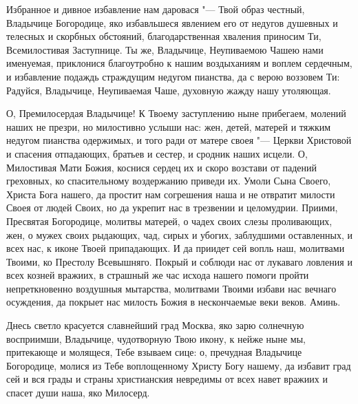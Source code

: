 

Избранное и дивное избавление нам даровася "--- Твой образ честный, Владычице Богородице, яко избавльшеся явлением его от недугов душевных и телесных и скорбных обстояний, благодарственная хваления приносим Ти, Всемилостивая Заступнице. Ты же, Владычице, Неупиваемою Чашею нами именуемая, приклонися благоутробно к нашим воздыханиям и воплем сердечным, и избавление подаждь страждущим недугом пианства, да с верою воззовем Ти: Радуйся, Владычице, Неупиваемая Чаше, духовную жажду нашу утоляющая.




О, Премилосердая Владычице! К Твоему заступлению ныне прибегаем, молений наших не презри, но милостивно услыши нас: жен, детей, матерей и тяжким недугом пианства одержимых, и того ради от матере своея "--- Церкви Христовой и спасения отпадающих, братьев и сестер, и сродник наших исцели. О, Милостивая Мати Божия, коснися сердец их и скоро возстави от падений греховных, ко спасительному воздержанию приведи их. Умоли Сына Своего, Христа Бога нашего, да простит нам согрешения наша и не отвратит милости Своея от людей Своих, но да укрепит нас в трезвении и целомудрии. Приими, Пресвятая Богородице, молитвы матерей, о чадех своих слезы проливающих, жен, о мужех своих рыдающих, чад, сирых и убогих, заблудшими оставленных, и всех нас, к иконе Твоей припадающих. И да приидет сей вопль наш, молитвами Твоими, ко Престолу Всевышняго. Покрый и соблюди нас от лукаваго ловления и всех козней вражиих, в страшный же час исхода нашего помоги пройти непреткновенно воздушныя мытарства, молитвами Твоими избави нас вечнаго осуждения, да покрыет нас милость Божия в нескончаемые веки веков. Аминь.
\mychapterending


\longpage{}
 



Днесь светло красуется славнейший град Москва, яко зарю солнечную восприимши, Владычице, чудотворную Твою икону, к нейже ныне мы, притекающе и молящеся, Тебе взываем сице: о, пречудная Владычице Богородице, молися из Тебе воплощенному Христу Богу нашему, да избавит град сей и вся грады и страны христианския невредимы от всех навет вражиих и спасет души наша, яко Милосерд. 


